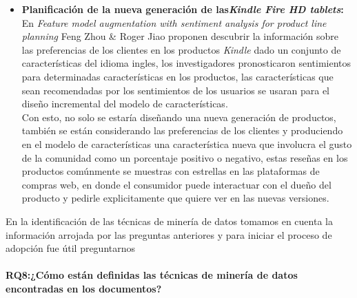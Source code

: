 \begin{itemize}
	\item  {\textbf{Planificación de la nueva generación de las\textit{Kindle Fire HD tablets}:}}
	  En \textit{Feature model augmentation with sentiment analysis for product line planning}\cite{Zhou2015b} Feng Zhou \& Roger Jiao proponen descubrir la información sobre las preferencias de los clientes en los productos \textit{Kindle} dado un conjunto de características del idioma ingles, los investigadores pronosticaron sentimientos para determinadas características en los productos, las características que sean recomendadas por los sentimientos de los usuarios se usaran para el diseño incremental del modelo de características.\\
	Con esto, no solo se estaría diseñando una nueva generación de productos, también se están considerando las preferencias de los clientes y produciendo en el modelo de características una característica nueva que involucra el gusto de la comunidad como un porcentaje positivo o negativo, estas reseñas en los productos comúnmente se muestras con estrellas en las plataformas de compras web, en donde el consumidor puede interactuar con el dueño del producto y pedirle explicitamente que quiere ver en las nuevas versiones.
	
	
\end{itemize}
 

En la identificación de las técnicas de minería de datos tomamos en cuenta la información arrojada por las preguntas anteriores y para iniciar el proceso de adopción fue útil preguntarnos
 \paragraph{RQ8:¿Cómo están definidas las técnicas de minería de datos encontradas en los documentos?}


